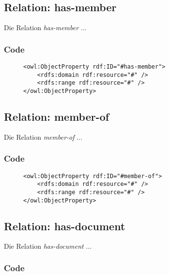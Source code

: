 \documentclass[
    11pt,
    latin1,
    a4paper,
    oneside
]{scrreprt}
\begin{document}
\subsection{Relation: has-member} \label{sec:rel_hasmember}

Die Relation \emph{has-member} ...

\subsubsection{Code} \label{sec:rel_hasmember_code}

\begin{figure}[h]
 \lstset{language=XML}
 \begin{lstlisting}[label=owl:word]
<owl:ObjectProperty rdf:ID="#has-member">
	<rdfs:domain rdf:resource="#" />
	<rdfs:range rdf:resource="#" />
</owl:ObjectProperty>
 \end{lstlisting}
\end{figure}


\subsection{Relation: member-of} \label{sec:rel_memberof}

Die Relation \emph{member-of} ...

\subsubsection{Code} \label{sec:rel_memberof_code}

\begin{figure}[h]
 \lstset{language=XML}
 \begin{lstlisting}[label=owl:word]
<owl:ObjectProperty rdf:ID="#member-of">
	<rdfs:domain rdf:resource="#" />
	<rdfs:range rdf:resource="#" />
</owl:ObjectProperty>
 \end{lstlisting}
\end{figure}


\subsection{Relation: has-document} \label{sec:rel_hasdocument}

Die Relation \emph{has-document} ...

\subsubsection{Code} \label{sec:rel_hasdocument_code}
\end{document}
